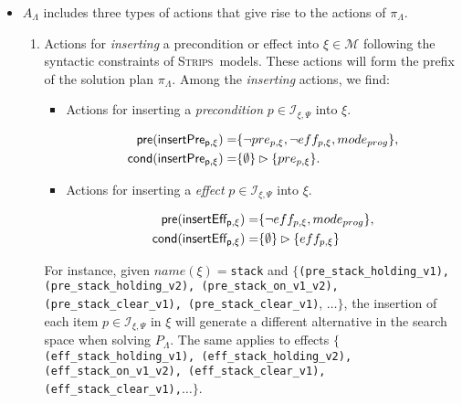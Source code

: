 \documentclass[runningheads]{llncs}
\newcommand{\pre}{\mathsf{pre}}     %
\newcommand{\cond}{\mathsf{cond}}   %
\newcommand{\strips}{\textsc{Strips}}     %
\begin{document}
\begin{itemize}
\item $A_{\Lambda}$ includes three types of actions that give rise to the actions of $\pi_\Lambda$.
\begin{enumerate}
\item Actions for {\em inserting} a precondition or effect into $\xi \in \mathcal{M}$ following the syntactic constraints of \strips\ models. These actions will form the prefix of the solution plan $\pi_\Lambda$. Among the \emph{inserting} actions, we find:
\begin{itemize}
\item Actions for inserting a {\em precondition} $p\in{\mathcal I}_{\xi,\Psi}$ into $\xi$.
\begin{small}
\begin{align*}
\hspace*{7pt}\pre(\mathsf{insertPre_{p,\xi}})=&\{\neg pre_{p,\xi}, \neg eff_{p,\xi}, mode_{prog}\},\\
\cond(\mathsf{insertPre_{p,\xi}})=&\{\emptyset\}\rhd\{pre_{p,\xi}\}.
\end{align*}
\end{small}

\item Actions for inserting a {\em effect} $p\in{\mathcal I}_{\xi,\Psi}$ into $\xi$. 
\begin{small}
\begin{align*}
\hspace*{7pt}\pre(\mathsf{insertEff_{p,\xi}})=&\{\neg eff_{p,\xi}, mode_{prog}\},\\
\cond(\mathsf{insertEff_{p,\xi}})=&\{\emptyset\}\rhd\{eff_{p,\xi}\}
\end{align*}
\end{small}
\end{itemize}

For instance, given $name(\xi)=${\tt{\small stack}} and $\{${\tt{\small (pre\_stack\_holding\_v1),} {\tt\small (pre\_stack\_holding\_v2)}, {\tt\small(pre\_stack\_on\_v1\_v2)}, {\tt\small(pre\_stack\_clear\_v1)}, {\tt\small(pre\_stack\_clear\_v1)}}, $\ldots \}$, the insertion of each item $p \in {\mathcal I}_{\xi,\Psi}$ in $\xi$ will generate a different alternative in the search space when solving $P_{\Lambda}$. The same applies to effects $\{${\tt{\small (eff\_stack\_holding\_v1)}, {\tt\small(eff\_stack\_holding\_v2)}, {\tt\small (eff\_stack\_on\_v1\_v2)}, {\tt\small (eff\_stack\_clear\_v1)}, {\tt\small (eff\_stack\_clear\_v1),}}$\ldots \}$.

\vspace{0.1cm}


\end{enumerate}
\end{itemize}
\end{document}
